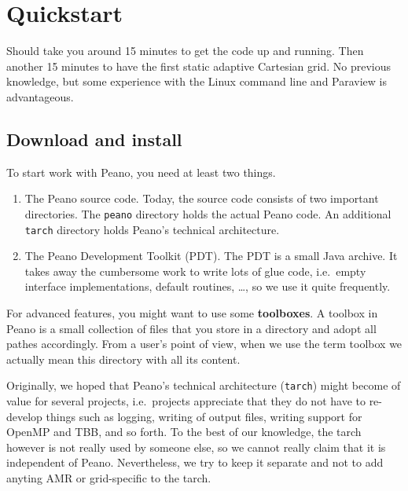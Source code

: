 \chapter{Quickstart}
\label{chapter:quickstart}


\chapterDescription
  {
    Should take you around 15 minutes to get the
    code up and running. Then another 15 minutes to have the first static
    adaptive Cartesian grid.
  }
  {
    No previous knowledge, but some experience with the Linux
    command line and Paraview is advantageous.
  }



\section{Download and install}

To start work with Peano, you need at least two things.

\begin{enumerate}
  \item The Peano source code. Today, the source code consists of two important
  directories. The \texttt{peano} directory holds the actual Peano code. An
  additional \texttt{tarch} directory holds Peano's technical architecture.
  \item The Peano Development Toolkit (PDT). The PDT is a small Java archive. It
  takes away the cumbersome work to write lots of glue code, i.e.~empty
  interface implementations, default routines, \ldots, so we use it quite
  frequently.
\end{enumerate}

\noindent
For advanced features, you might want to use some {\bf toolboxes}.
A toolbox in Peano is a small collection of files that you store in a directory
and adopt all pathes accordingly.
From a user's point of view, when we use the term toolbox we actually mean this
directory with all its content.



\begin{remark}
Originally, we hoped that Peano's technical architecture (\texttt{tarch}) might
become of value for several projects, i.e.~projects appreciate that they do not
have to re-develop things such as logging, writing of output files, writing
support for OpenMP and TBB, and so forth.
To the best of our knowledge, the tarch however is not really used by someone
else, so we cannot really claim that it is independent of Peano.
Nevertheless, we try to keep it separate and not to add anyting AMR or
grid-specific to the tarch.
\end{remark}

